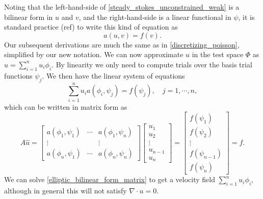 \documentclass[11pt,a4paper]{memoir}
\newcommand{\inner}[1]{\left<#1\right>}
\begin{document}
Noting that the left-hand-side of \eqref{steady_stokes_unconstrained_weak} is a bilinear form in $u$ and $v$, and the right-hand-side
is a linear functional in $\psi$, it is standard practice (ref) to write this kind of equation as
\begin{equation}
    a(u, v) = f(v).
\end{equation}
Our subsequent derivations are much the same as in \ref{discretizing_poisson}, simplified by our new notation.
We can now approximate $u$ in the test space $\Phi$ as $\hat{u} = \sum_{i=1}^nu_i\phi_i$. By linearity we only need to compute
trials over the basis trial functions $\psi_j$.
We then have the linear system of equations
\begin{equation}\label{elliptic_bilinear_form}
    \sum_{i=1}^n u_i a\left(\phi_i, \psi_j\right) = f(\psi_j),\quad j=1,\cdots,n,
\end{equation}
which can be written in matrix form as
\begin{equation}\label{elliptic_bilinear_form_matrix}
    A\hat{u} = \begin{bmatrix}
            a(\phi_1, \psi_1) & \cdots & a(\phi_1, \psi_n) \\
            \vdots & & \vdots \\
            a(\phi_n, \psi_1) & \cdots & a(\phi_n, \psi_n)
            \end{bmatrix}
    \begin{bmatrix} u_1 \\ u_2 \\ \vdots \\ u_{n-1} \\ u_n \end{bmatrix}
    =
    \begin{bmatrix} f(\psi_1) \\ f(\psi_2) \\ \vdots \\ f(\psi_{n-1}) \\ f(\psi_{n}) \end{bmatrix}
    = \hat{f}.
\end{equation}
We can solve \eqref{elliptic_bilinear_form_matrix} to get a velocity field $\sum_{i=1}^n u_i\phi_i$, although in general this will not satisfy $\nabla\cdot u = 0$.
\end{document}
